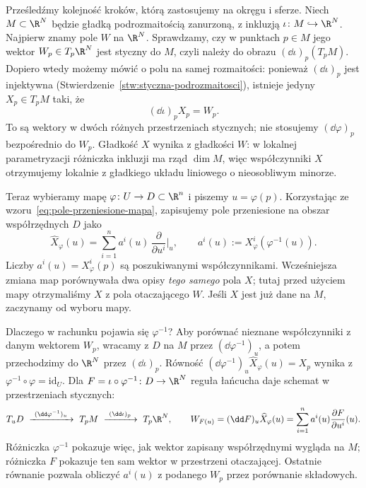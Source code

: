 \begin{uwaga}
Prześledźmy kolejność kroków, którą zastosujemy na okręgu i sferze.
Niech $M\subset\R^N$ będzie gładką podrozmaitością zanurzoną,
z inkluzją
$\iota\colon M\hookrightarrow\R^N$. Najpierw znamy pole $W$
na $\R^N$. Sprawdzamy, czy w punktach $p\in M$ jego wektor
$W_p\in T_p\R^N$ jest styczny do $M$, czyli należy do obrazu
$(\dd\iota)_p(T_pM)$. Dopiero wtedy możemy mówić o polu na samej
rozmaitości: ponieważ $(\dd\iota)_p$ jest injektywna
(Stwierdzenie~\ref{stw:styczna-podrozmaitosci}), istnieje
jedyny $X_p\in T_pM$ taki, że
\[
(\dd\iota)_pX_p=W_p.
\]
To są wektory w dwóch różnych przestrzeniach stycznych;
nie stosujemy $(\dd\varphi)_p$ bezpośrednio do $W_p$.
Gładkość $X$ wynika z gładkości $W$: w lokalnej parametryzacji
różniczka inkluzji ma rząd $\dim M$, więc współczynniki $X$
otrzymujemy lokalnie z gładkiego układu liniowego o nieosobliwym minorze.

Teraz wybieramy mapę $\varphi\colon U\to D\subset\R^n$ i piszemy
$u=\varphi(p)$. Korzystając ze wzoru~\eqref{eq:pole-przeniesione-mapa},
zapisujemy pole przeniesione na obszar współrzędnych $D$ jako
\[
\widehat X_\varphi(u)
=\sum_{i=1}^n a^i(u)\,
  \frac{\partial}{\partial u^i}\Big|_u,
\qquad a^i(u):=X_\varphi^i(\varphi^{-1}(u)).
\]
Liczby $a^i(u)=X_\varphi^i(p)$ są poszukiwanymi współczynnikami.
Wcześniejsza zmiana map porównywała dwa opisy \emph{tego samego}
pola $X$; tutaj przed użyciem mapy otrzymaliśmy $X$ z pola
otaczającego $W$. Jeśli $X$ jest już dane na $M$, zaczynamy
od wyboru mapy.

Dlaczego w rachunku pojawia się $\varphi^{-1}$? Aby porównać
nieznane współczynniki z danym wektorem $W_p$, wracamy z $D$
na $M$ przez $(\dd\varphi^{-1})_u$, a potem przechodzimy
do $\R^N$ przez $(\dd\iota)_p$. Równość
$(\dd\varphi^{-1})_u\widehat X_\varphi(u)=X_p$ wynika
z~$\varphi^{-1}\circ\varphi=\mathrm{id}_U$. Dla
$F=\iota\circ\varphi^{-1}\colon D\to\R^N$ reguła łańcucha daje
schemat w przestrzeniach stycznych:
\[
T_uD\ \xrightarrow{\ (\dd\varphi^{-1})_u\ }\ T_pM
\ \xrightarrow{\ (\dd\iota)_p\ }\ T_p\R^N,
\qquad
W_{F(u)}=(\dd F)_u\widehat X_\varphi(u)
=\sum_{i=1}^n a^i(u)\frac{\partial F}{\partial u^i}(u).
\]
Różniczka $\varphi^{-1}$ pokazuje więc, jak wektor zapisany
współrzędnymi wygląda na $M$; różniczka $F$ pokazuje ten sam
wektor w przestrzeni otaczającej. Ostatnie równanie pozwala
obliczyć $a^i(u)$ z podanego $W_p$ przez porównanie składowych.
\end{uwaga}

